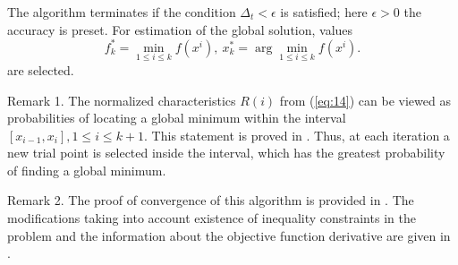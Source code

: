 \documentclass[smallcondensed]{svjour3}     %
\begin{document}
The algorithm terminates if the condition $\Delta_t<\epsilon$ is satisfied; here $\epsilon>0$ the accuracy is preset. For estimation of the global solution, values
\[
f_k^\ast=\min_{1\leq i \leq k}f(x^i), \ x_k^\ast=\arg \min_{1\leq i \leq k}f(x^i).
\]
are selected.

Remark 1. The normalized characteristics $R(i)$ from (\ref{eq:14}) can be viewed as probabilities of locating a global minimum within the interval $[x_{i-1},x_i], 1\leq i \leq k+1$. This statement is proved in \cite{RefStrongin2000}. Thus, at each iteration a new trial point is selected inside the interval, which has the greatest probability of finding a global minimum. 

Remark 2. The proof of convergence of this algorithm is provided in \cite{RefStrongin2000}. The modifications taking into account existence of inequality constraints in the problem and the information about the objective function derivative are given in \cite{RefBarkalov,RefGergel1996,RefGergel1997}.
\end{document}
